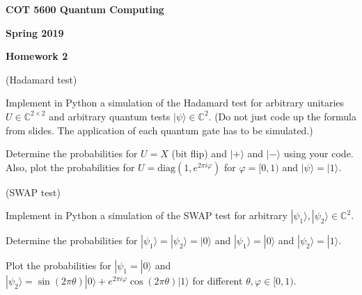 \documentclass[12pt]{article}
\renewcommand{\>}{\rangle}
\newcommand{\<}{\langle}
\newcommand{\C}{\mathbb{C}}
\begin{document}
\begin{center}
{\bf COT 5600 Quantum Computing} 

\medskip
{\bf Spring 2019}

\bigskip

{\bf Homework 2}
\end{center}

\newpage


 (Hadamard test)

\medskip
\noindent
Implement in Python a simulation of the Hadamard test for arbitrary unitaries $U\in\C^{2\times 2}$ and arbitrary quantum tests $|\psi\>\in\C^2$.  (Do not just code up the formula from slides. The application of each quantum gate has to be simulated.)

\medskip
\noindent
Determine the probabilities for $U=X$ (bit flip) and $|+\>$ and $|-\>$ using your code. Also, plot the probabilities for $U=\mathrm{diag}(1, e^{2\pi i\varphi})$ for $\varphi=[0,1)$ and $|\psi\>=|1\>$.

\newpage


 (SWAP test)

\medskip

\noindent
Implement in Python a simulation of the SWAP test for arbitrary $|\psi_1\>,|\psi_2\>\in\C^2$.

\medskip
\noindent
Determine the probabilities for $|\psi_1\>=|\psi_2\>=|0\>$ and $|\psi_1\>=|0\>$ and $|\psi_2\> = |1\>$. 

\medskip
\noindent
Plot the probabilities for $|\psi_1=|0\>$ and $|\psi_2\>= \sin(2\pi \theta) |0\> + e^{2\pi i \varphi} \cos(2 \pi \theta) |1\>$ for different $\theta, \varphi \in [0,1)$.

\end{document}

